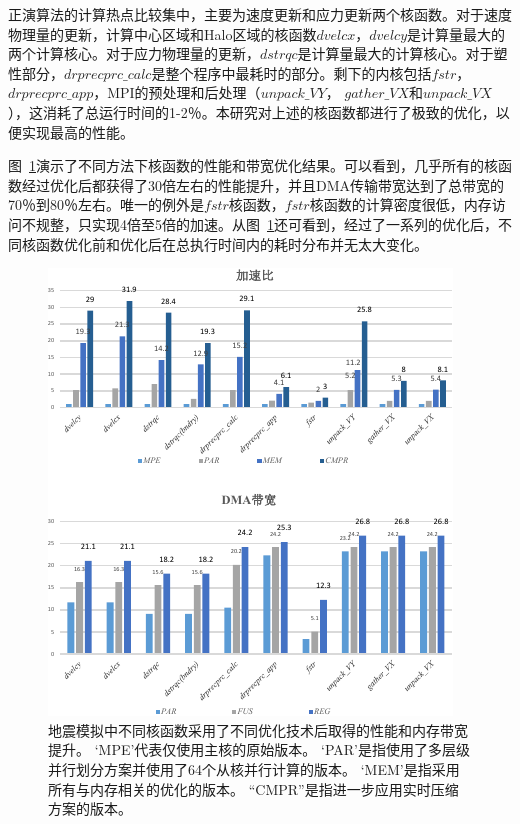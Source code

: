 \documentclass[degree=doctor]{thuthesis}
\begin{document}
正演算法的计算热点比较集中，主要为速度更新和应力更新两个核函数。对于速度物理量的更新，计算中心区域和Halo区域的核函数$ dvelcx，dvelcy $是计算量最大的两个计算核心。对于应力物理量的更新，$ dstrqc $是计算量最大的计算核心。对于塑性部分，$ drprecprc\_calc $是整个程序中最耗时的部分。剩下的内核包括$ fstr $，$ drprecprc\_app $，MPI的预处理和后处理（$ unpack\_VY $，
$ gather\_VX $和$ unpack\_VX $），这消耗了总运行时间的1-2％。本研究对上述的核函数都进行了极致的优化，以便实现最高的性能。

图~\ref{fig:kernel-result}演示了不同方法下核函数的性能和带宽优化结果。可以看到，几乎所有的核函数经过优化后都获得了30倍左右的性能提升，并且DMA传输带宽达到了总带宽的70％到80％左右。唯一的例外是$ fstr $核函数，$fstr$核函数的计算密度很低，内存访问不规整，只实现4倍至5倍的加速。从图~\ref{fig:kernel-result}还可看到，经过了一系列的优化后，不同核函数优化前和优化后在总执行时间内的耗时分布并无太大变化。

\begin{figure}[t]
\centering
\includegraphics[width=0.9\columnwidth]{AWP-performance-crop.pdf}
\caption{地震模拟中不同核函数采用了不同优化技术后取得的性能和内存带宽提升。 `MPE'代表仅使用主核的原始版本。 `PAR'是指使用了多层级并行划分方案并使用了64个从核并行计算的版本。 `MEM'是指采用所有与内存相关的优化的版本。 “CMPR”是指进一步应用实时压缩方案的版本。}
\label{fig:kernel-result}
\end{figure}
\end{document}
